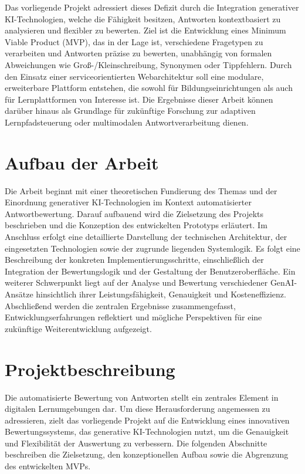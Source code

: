 \documentclass[a4paper,12pt]{article}
\begin{document}
Das vorliegende Projekt adressiert dieses Defizit durch die Integration generativer KI-Technologien, welche die Fähigkeit besitzen, Antworten kontextbasiert zu analysieren und flexibler zu bewerten. Ziel ist die Entwicklung eines Minimum Viable Product (MVP), das in der Lage ist, verschiedene Fragetypen zu verarbeiten und Antworten präzise zu bewerten, unabhängig von formalen Abweichungen wie Groß-/Kleinschreibung, Synonymen oder Tippfehlern. Durch den Einsatz einer serviceorientierten Webarchitektur soll eine modulare, erweiterbare Plattform entstehen, die sowohl für Bildungseinrichtungen als auch für Lernplattformen von Interesse ist. Die Ergebnisse dieser Arbeit können darüber hinaus als Grundlage für zukünftige Forschung zur adaptiven Lernpfadsteuerung oder multimodalen Antwortverarbeitung dienen.

\section{Aufbau der Arbeit}
Die Arbeit beginnt mit einer theoretischen Fundierung des Themas und der Einordnung generativer KI-Technologien im Kontext automatisierter Antwortbewertung. Darauf aufbauend wird die Zielsetzung des Projekts beschrieben und die Konzeption des entwickelten Prototyps erläutert. Im Anschluss erfolgt eine detaillierte Darstellung der technischen Architektur, der eingesetzten Technologien sowie der zugrunde liegenden Systemlogik. Es folgt eine Beschreibung der konkreten Implementierungsschritte, einschließlich der Integration der Bewertungslogik und der Gestaltung der Benutzeroberfläche. Ein weiterer Schwerpunkt liegt auf der Analyse und Bewertung verschiedener GenAI-Ansätze hinsichtlich ihrer Leistungsfähigkeit, Genauigkeit und Kosteneffizienz. Abschließend werden die zentralen Ergebnisse zusammengefasst, Entwicklungserfahrungen reflektiert und mögliche Perspektiven für eine zukünftige Weiterentwicklung aufgezeigt.

\newpage

\section{Projektbeschreibung}
Die automatisierte Bewertung von Antworten stellt ein zentrales Element in digitalen Lernumgebungen dar. Um diese Herausforderung angemessen zu adressieren, zielt das vorliegende Projekt auf die Entwicklung eines innovativen Bewertungssystems, das generative KI-Technologien nutzt, um die Genauigkeit und Flexibilität der Auswertung zu verbessern. Die folgenden Abschnitte beschreiben die Zielsetzung, den konzeptionellen Aufbau sowie die Abgrenzung des entwickelten MVPs.
\end{document}
